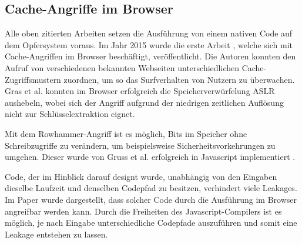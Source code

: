 
\subsection{Cache-Angriffe im Browser}

Alle oben zitierten Arbeiten setzen die Ausführung von einem nativen Code auf dem Opfersystem voraus. Im Jahr 2015 wurde die erste Arbeit \cite{TheSpyInTheSandbox}, welche sich mit Cache-Angriffen im Browser beschäftigt, veröffentlicht.
Die Autoren konnten den Aufruf von verschiedenen bekannten Webseiten unterschiedlichen Cache-Zugriffsmustern zuordnen, um so das Surfverhalten von Nutzern zu überwachen.
Gras et al. \cite{ASLROnTheLine} konnten im Browser erfolgreich die Speicherverwürfelung ASLR aushebeln, wobei sich der Angriff aufgrund der niedrigen zeitlichen Auflösung nicht zur Schlüsselextraktion eignet.

Mit dem Rowhammer-Angriff \cite{Rowhammer} ist es möglich, Bits im Speicher ohne Schreibzugriffe zu verändern, um beispielsweise Sicherheitsvorkehrungen zu umgehen. 
Dieser wurde von Gruss et al. erfolgreich in Javascript implementiert \cite{RowhammerJS}.

Code, der im Hinblick darauf designt wurde, unabhängig von den Eingaben dieselbe Laufzeit und denselben Codepfad zu besitzen, verhindert viele Leakages.
Im Paper \cite{DriveByPaper} wurde dargestellt, dass solcher Code durch die Ausführung im Browser angreifbar werden kann.
Durch die Freiheiten des Javascript-Compilers ist es möglich, je nach Eingabe unterschiedliche Codepfade auszuführen und somit eine Leakage entstehen zu lassen.

